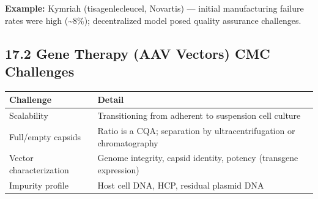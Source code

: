 \documentclass[
  11pt,
  a4paper,
]{report}
\begin{document}
\textbf{Example:} Kymriah (tisagenlecleucel, Novartis) --- initial
manufacturing failure rates were high (\textasciitilde8\%);
decentralized model posed quality assurance challenges.

\hypertarget{gene-therapy-aav-vectors-cmc-challenges}{%
\subsection{17.2 Gene Therapy (AAV Vectors) CMC
Challenges}\label{gene-therapy-aav-vectors-cmc-challenges}}

\begin{longtable}[]{@{}ll@{}}
\toprule
\begin{minipage}[b]{0.54\columnwidth}\raggedright
Challenge\strut
\end{minipage} & \begin{minipage}[b]{0.40\columnwidth}\raggedright
Detail\strut
\end{minipage}\tabularnewline
\midrule
\endhead
\begin{minipage}[t]{0.54\columnwidth}\raggedright
Scalability\strut
\end{minipage} & \begin{minipage}[t]{0.40\columnwidth}\raggedright
Transitioning from adherent to suspension cell culture\strut
\end{minipage}\tabularnewline
\begin{minipage}[t]{0.54\columnwidth}\raggedright
Full/empty capsids\strut
\end{minipage} & \begin{minipage}[t]{0.40\columnwidth}\raggedright
Ratio is a CQA; separation by ultracentrifugation or
chromatography\strut
\end{minipage}\tabularnewline
\begin{minipage}[t]{0.54\columnwidth}\raggedright
Vector characterization\strut
\end{minipage} & \begin{minipage}[t]{0.40\columnwidth}\raggedright
Genome integrity, capsid identity, potency (transgene expression)\strut
\end{minipage}\tabularnewline
\begin{minipage}[t]{0.54\columnwidth}\raggedright
Impurity profile\strut
\end{minipage} & \begin{minipage}[t]{0.40\columnwidth}\raggedright
Host cell DNA, HCP, residual plasmid DNA\strut
\end{minipage}\tabularnewline

\end{longtable}
\end{document}
